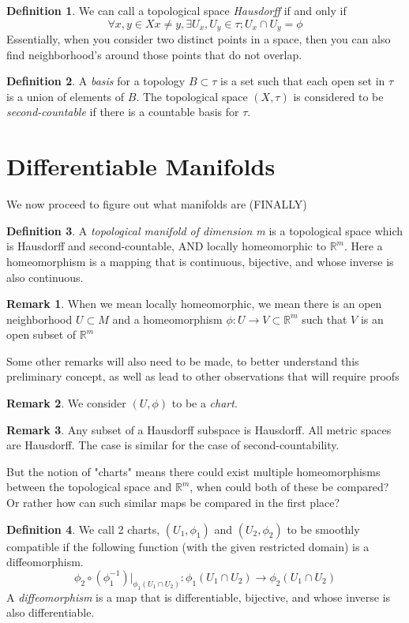 \documentclass[12pt]{book}
\theoremstyle{definition}
\newtheorem*{definition}{Definition}
\newtheorem*{remark}{Remark}
\begin{document}
\begin{definition}
    We can call a topological space \textit{Hausdorff} if and only if $$\forall x, y \in X x \neq y, \exists U_x, U_y \in \tau; U_x \cap U_y = \phi$$
    Essentially, when you consider two distinct points in a space, then you can also find neighborhood's around those points that do not overlap. 
\end{definition}
\begin{definition}
    A \textit{basis} for a topology $B \subset \tau$ is a set such that each open set in $\tau$ is a union of elements of $B$. The topological space $(X, \tau)$ is considered to be \textit{second-countable} if there is a countable basis for $\tau$.
\end{definition}
\section{Differentiable Manifolds}
We now proceed to figure out what manifolds are (FINALLY)
\begin{definition}
    A \textit{topological manifold of dimension m} is a topological space which is Hausdorff and second-countable, AND locally homeomorphic to $\mathbb{R}^m$. Here a homeomorphism is a mapping that is continuous, bijective, and whose inverse is also continuous.
\end{definition}
\begin{remark}
    When we mean locally homeomorphic, we mean there is an open neighborhood $U \subset M$ and a homeomorphism $\phi: U \to V \subset \mathbb{R}^m$ such that $V$ is an open subset of  $\mathbb{R}^m$
\end{remark}
Some other remarks will also need to be made, to better understand this preliminary concept, as well as lead to other observations that will require proofs
\begin{remark}
    We consider $(U, \phi)$ to be a \textit{chart}. 
\end{remark}
\begin{remark}
    Any subset of a Hausdorff subspace is Hausdorff. All metric spaces are Hausdorff. The case is similar for the case of second-countability.
\end{remark}
But the notion of "charts" means there could exist multiple homeomorphisms between the topological space and $\mathbb{R}^m$, when could both of these be compared? Or rather how can such similar maps be compared in the first place?
\begin{definition}
    We call 2 charts, $(U_1, \phi_1)$ and $(U_2, \phi_2)$ to be smoothly compatible if the following function (with the given restricted domain) is a diffeomorphism.
    $$\phi_2 \circ (\phi_1^{-1})|_{\phi_1 (U_1 \cap U_2)}: \phi_1(U_1 \cap U_2) \to \phi_2(U_1 \cap U_2)$$
    A \textit{diffeomorphism} is a map that is differentiable, bijective, and whose inverse is also differentiable.
\end{definition}
\end{document}
